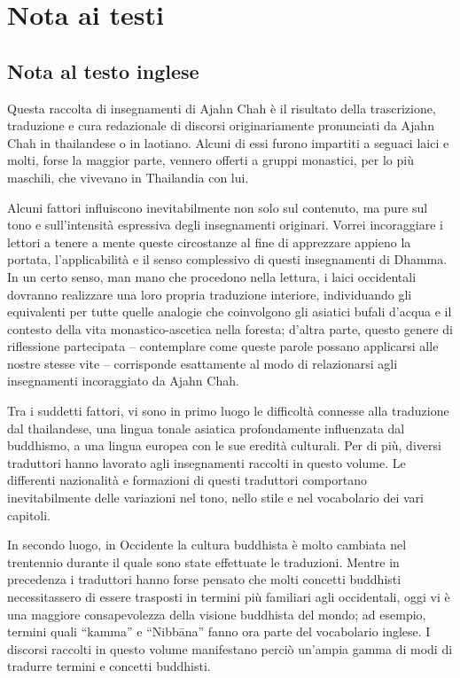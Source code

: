 \chapter{Nota ai testi}

\section{Nota al testo inglese}

Questa raccolta di insegnamenti di Ajahn Chah è il risultato della
trascrizione, traduzione e cura redazionale di discorsi originariamente
pronunciati da Ajahn Chah in thailandese o in laotiano. Alcuni di essi
furono impartiti a seguaci laici e molti, forse la maggior parte,
vennero offerti a gruppi monastici, per lo più maschili, che vivevano in
Thailandia con lui.

Alcuni fattori influiscono inevitabilmente non solo sul contenuto, ma
pure sul tono e sull'intensità espressiva degli insegnamenti originari.
Vorrei incoraggiare i lettori a tenere a mente queste circostanze al
fine di apprezzare appieno la portata, l'applicabilità e il senso
complessivo di questi insegnamenti di Dhamma. In un certo senso, man
mano che procedono nella lettura, i laici occidentali dovranno
realizzare una loro propria traduzione interiore, individuando gli
equivalenti per tutte quelle analogie che coinvolgono gli asiatici
bufali d'acqua e il contesto della vita monastico-ascetica nella
foresta; d'altra parte, questo genere di riflessione partecipata --
contemplare come queste parole possano applicarsi alle nostre stesse
vite -- corrisponde esattamente al modo di relazionarsi agli
insegnamenti incoraggiato da Ajahn Chah.

Tra i suddetti fattori, vi sono in primo luogo le difficoltà connesse
alla traduzione dal thailandese, una lingua tonale asiatica
profondamente influenzata dal buddhismo, a una lingua europea con le sue
eredità culturali. Per di più, diversi traduttori hanno lavorato agli
insegnamenti raccolti in questo volume. Le differenti nazionalità e
formazioni di questi traduttori comportano inevitabilmente delle
variazioni nel tono, nello stile e nel vocabolario dei vari capitoli.

In secondo luogo, in Occidente la cultura buddhista è molto cambiata nel
trentennio durante il quale sono state effettuate le traduzioni. Mentre
in precedenza i traduttori hanno forse pensato che molti concetti
buddhisti necessitassero di essere trasposti in termini più familiari
agli occidentali, oggi vi è una maggiore consapevolezza della visione
buddhista del mondo; ad esempio, termini quali ``kamma'' e ``Nibbāna''
fanno ora parte del vocabolario inglese. I discorsi raccolti in questo
volume manifestano perciò un'ampia gamma di modi di tradurre termini e
concetti buddhisti.

